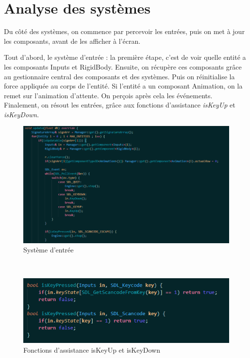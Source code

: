 \documentclass[12pt, openany]{report}
\begin{document}
\section{Analyse des syst\`emes}
Du c\^ot\'e des syst\`emes, on commence par percevoir les entr\'ees, puis on met \`a jour les composants, avant de les afficher \`a l'\'ecran.
\\
\par Tout d'abord, le syst\`eme d'entr\'ee : la premi\`ere \'etape, c'est de voir quelle entit\'e a les composants Inputs et RigidBody. Ensuite, on r\'ecup\`ere ces composants gr\^ace au gestionnaire central des composants et des syst\`emes. Puis on r\'einitialise la force appliqu\'ee au corps de l'entit\'e. Si l'entit\'e a un composant Animation, on la remet sur l'animation d'attente. On per\c cois apr\`es cela les \'ev\'enements. Finalement, on r\'esout les entr\'ees, gr\^ace aux fonctions d'assistance \textit{isKeyUp} et \textit{isKeyDown}.
\begin{figure}[!h]
\centering
\includegraphics[scale=0.5]{inputsys.png}
\caption{Syst\`eme d'entr\'ee}
\end{figure}
\\[0.2cm]
\begin{figure}[!h]
\centering
\includegraphics[scale=1]{inputsys2.png}
\caption{Fonctions d'assistance isKeyUp et isKeyDown}
\end{figure}
\newpage
\end{document}
